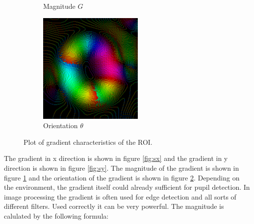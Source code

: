 \begin{figure}[ht]
\begin{subfigure}{.33\textwidth}
        \caption{Magnitude \textbf{$G$}}
        \label{fig:mag}
      \end{subfigure}%
      \begin{subfigure}{.33\textwidth}
        \centering
        \includegraphics[width=.9\linewidth]{plots/eye_dataset/direction.png}
        \caption{Orientation \textbf{$\theta$}}
        \label{fig:orientation}
      \end{subfigure}
      \caption{Plot of gradient characteristics of the ROI.}
      \label{fig:gradient}
      \end{figure}
      
      The gradient in x direction is shown in figure \ref{fig:sx} and the gradient in y direction is shown in figure \ref{fig:sy}. The magnitude of the gradient is shown in figure \ref{fig:mag} and the orientation of the gradient is shown in figure \ref{fig:orientation}. Depending on the environment, the gradient itself could already sufficient for pupil detection. In image processing the gradient is often used for edge detection and all sorts of different filters. Used correctly it can be very powerful. The magnitude is calulated by the following formula: 

